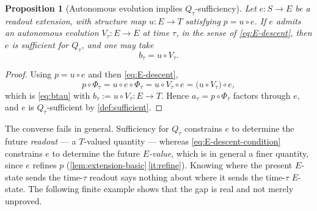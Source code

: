 \documentclass[11pt,reqno]{amsart}
\theoremstyle{plain}
\newtheorem{proposition}[theorem]{Proposition}
\theoremstyle{definition}
\newcommand{\Src}{S}
\newcommand{\Rdt}{T}
\begin{document}
\begin{proposition}[Autonomous evolution implies $Q_\tau$-sufficiency]\label{prop:auto-implies-suff}
Let $e\colon\Src\to E$ be a readout extension, with structure map $u\colon E\to\Rdt$ satisfying
$p=u\circ e$. If $e$ admits an autonomous evolution $V_\tau\colon E\to E$ at time $\tau$, in the
sense of \eqref{eq:E-descent}, then $e$ is sufficient for $Q_\tau$, and one may take
\begin{equation}\label{eq:btau-from-V}
b_\tau=u\circ V_\tau .
\end{equation}
\end{proposition}

\begin{proof}
Using $p=u\circ e$ and then \eqref{eq:E-descent},
\begin{equation*}
p\circ\Phi_\tau
=u\circ e\circ\Phi_\tau
=u\circ V_\tau\circ e
=\bigl(u\circ V_\tau\bigr)\circ e ,
\end{equation*}
which is \eqref{eq:btau} with $b_\tau:=u\circ V_\tau\colon E\to\Rdt$. Hence $a_\tau=p\circ\Phi_\tau$
factors through $e$, and $e$ is $Q_\tau$-sufficient by \cref{def:sufficient}.
\end{proof}

The converse fails in general. Sufficiency for $Q_\tau$ constrains $e$ to determine the future
\emph{readout} --- a $\Rdt$-valued quantity --- whereas \eqref{eq:E-descent-condition} constrains
$e$ to determine the future \emph{$E$-value}, which is in general a finer quantity, since $e$
refines $p$ (\cref{lem:extension-basic}\,\eqref{it:refine}). Knowing where the present $E$-state
sends the time-$\tau$ readout says nothing about where it sends the time-$\tau$ $E$-state. The
following finite example shows that the gap is real and not merely unproved.
\end{document}
